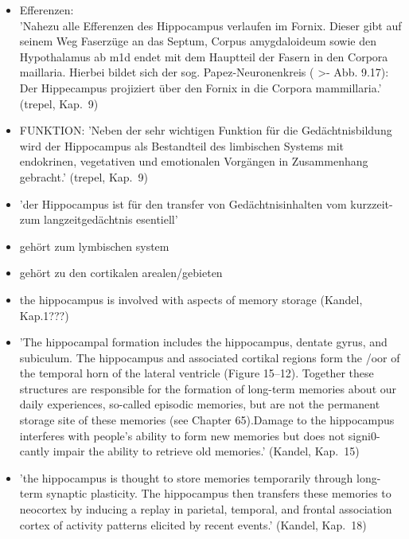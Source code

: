 \documentclass[12pt,a4paper,pdftex]{article}
\begin{document}
\begin{itemize}
\item Efferenzen:\\
'Nahezu alle Efferenzen des Hippocampus verlaufen im Fornix. Dieser gibt auf seinem Weg Faserzüge an das Septum, Corpus amygdaloideum sowie den Hypothalamus ab m1d endet mit dem Hauptteil der Fasern in den Corpora maillaria. Hierbei bildet sich der sog. Papez-Neuronenkreis ( >- Abb. 9.17): Der Hippecampus projiziert über den Fornix in die Corpora mammillaria.' (trepel, Kap.~9)

\item FUNKTION: 'Neben der sehr wichtigen Funktion für die Gedächtnisbildung wird der Hippocampus als Bestandteil des limbischen Systems mit endokrinen, vegetativen und emotionalen Vorgängen in Zusammenhang gebracht.' (trepel, Kap.~9)

\item 'der Hippocampus ist für den transfer von Gedächtnisinhalten vom kurzzeit- zum langzeitgedächtnis esentiell' \cite[Kap.~6]{storch2012lehrbuchzoo}

\item gehört zum lymbischen system \cite[Kap.~6]{storch2012lehrbuchzoo}

\item gehört zu den cortikalen arealen/gebieten  \cite[Kap.~6]{storch2012lehrbuchzoo}

\item the hippocampus is involved with aspects of memory storage (Kandel, Kap.1???)

\item 'The hippocampal formation includes the hippocampus, dentate gyrus, and subiculum. The hippocampus and associated cortikal regions form the /oor of the temporal horn of the lateral ventricle (Figure 15–12). Together these structures are responsible for the formation of long-term memories about our daily experiences, so-called episodic memories, but are not the permanent storage site of these memories (see Chapter 65).Damage to the hippocampus interferes with people’s ability to form new memories but does not signi0-cantly impair the ability to retrieve old memories.' (Kandel, Kap.~15)

\item 'the hippocampus is thought to store memories temporarily through long-term synaptic plasticity. The hippocampus then transfers these memories to neocortex by inducing a replay in parietal, temporal, and frontal association cortex of activity patterns elicited by recent events.' (Kandel, Kap.~18)

\end{itemize}
\end{document}

